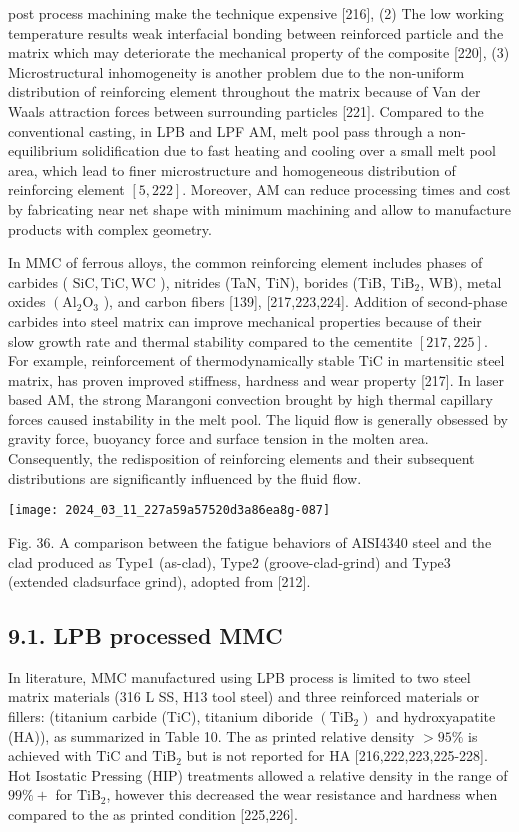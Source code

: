 \documentclass[10pt]{article}
\begin{document}
post process machining make the technique expensive [216], (2) The low working temperature results weak interfacial bonding between reinforced particle and the matrix which may deteriorate the mechanical property of the composite [220], (3) Microstructural inhomogeneity is another problem due to the non-uniform distribution of reinforcing element throughout the matrix because of Van der Waals attraction forces between surrounding particles [221]. Compared to the conventional casting, in LPB and LPF AM, melt pool pass through a non-equilibrium solidification due to fast heating and cooling over a small melt pool area, which lead to finer microstructure and homogeneous distribution of reinforcing element $[5,222]$. Moreover, AM can reduce processing times and cost by fabricating near net shape with minimum machining and allow to manufacture products with complex geometry.

In MMC of ferrous alloys, the common reinforcing element includes phases of carbides ( $\mathrm{SiC}, \mathrm{TiC}, \mathrm{WC}$ ), nitrides (TaN, TiN), borides (TiB, $\mathrm{TiB}_{2}$, $\mathrm{WB})$, metal oxides $\left(\mathrm{Al}_{2} \mathrm{O}_{3}\right.$ ), and carbon fibers [139], [217,223,224]. Addition of second-phase carbides into steel matrix can improve mechanical properties because of their slow growth rate and thermal stability compared to the cementite $[217,225]$. For example, reinforcement of thermodynamically stable $\mathrm{TiC}$ in martensitic steel matrix, has proven improved stiffness, hardness and wear property [217]. In laser based AM, the strong Marangoni convection brought by high thermal capillary forces caused instability in the melt pool. The liquid flow is generally obsessed by gravity force, buoyancy force and surface tension in the molten area. Consequently, the redisposition of reinforcing elements and their subsequent distributions are significantly influenced by the fluid flow.

\begin{center}
\texttt{[image: 2024\_03\_11\_227a59a57520d3a86ea8g-087]}
\end{center}

Fig. 36. A comparison between the fatigue behaviors of AISI4340 steel and the clad produced as Type1 (as-clad), Type2 (groove-clad-grind) and Type3 (extended cladsurface grind), adopted from [212].

\subsection*{9.1. LPB processed MMC}
In literature, MMC manufactured using LPB process is limited to two steel matrix materials (316 L SS, H13 tool steel) and three reinforced materials or fillers: (titanium carbide (TiC), titanium diboride $\left(\mathrm{TiB}_{2}\right)$ and hydroxyapatite (HA)), as summarized in Table 10. The as printed relative density $>95 \%$ is achieved with $\mathrm{TiC}$ and $\mathrm{TiB}_{2}$ but is not reported for HA [216,222,223,225-228]. Hot Isostatic Pressing (HIP) treatments allowed a relative density in the range of $99 \%+$ for $\mathrm{TiB}_{2}$, however this decreased the wear resistance and hardness when compared to the as printed condition [225,226].
\end{document}
